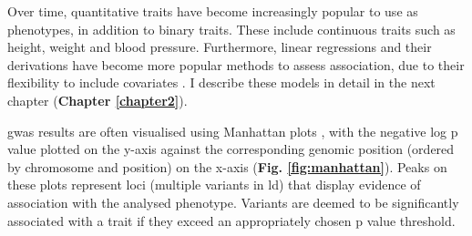 Over time, quantitative traits have become increasingly popular to use as phenotypes, in addition to binary traits.
These include continuous traits such as height, weight and blood pressure.
Furthermore, linear regressions and their derivations have become more popular methods to assess association, due to their flexibility to include covariates \cite{mccarthy2008genome}.
I describe these models in detail in the next chapter (\textbf{Chapter 
\ref{chapter2}}). 

\newpage

\gls{gwas} results are often visualised using Manhattan plots \cite{mccarthy2008genome}, with the negative log p value plotted on the y-axis against the corresponding genomic position (ordered by chromosome and position) on the x-axis (\textbf{Fig. \ref{fig:manhattan}}). 
Peaks on these plots represent loci (multiple variants in \gls{ld}) that display evidence of association with the analysed phenotype. 
Variants are deemed to be significantly associated with a trait if they exceed an appropriately chosen p value threshold. 

